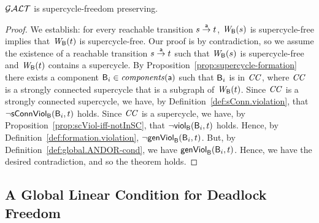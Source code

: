 \begin{theorem} \label{thm:GAO.SC-free-preserving}
$\mathcal{GALT}$ is supercycle-freedom preserving.
\end{theorem}
%
\begin{proof}
We establish:
for every reachable transition $s \stackrel{\mathsf{a}}{\rightarrow} t$,
$\mathit{W}_{\mathsf{B}}({s})$ is supercycle-free implies that $\mathit{W}_{\mathsf{B}}({t})$ is
supercycle-free. Our proof is by contradiction, so we assume the existence of a reachable transition
$s \stackrel{\mathsf{a}}{\rightarrow} t$ such that $\mathit{W}_{\mathsf{B}}({s})$ is supercycle-free and $\mathit{W}_{\mathsf{B}}({t})$ contains a supercycle.
%
By Proposition~\ref{prop:supercycle-formation}
 there exists a component $\mathsf{B}_i \in \mathit{components}(\mathsf{a})$ such that $\mathsf{B}_i$ is in $\mathit{CC}$, where 
$\mathit{CC}$ is a strongly connected supercycle that is a subgraph of $\mathit{W}_{\mathsf{B}}({t})$.
%
Since $\mathit{CC}$ is a strongly connected supercycle, we have,
 by Definition~\ref{def:sConn.violation}, that $\neg \mathsf{sConnViol}_{\mathsf{B}}(\mathsf{B}_i,t)$ holds.
%
Since $\mathit{CC}$ is a supercycle, we have, by Proposition~\ref{prop:scViol-iff-notInSC}, 
that $\neg \mathsf{viol}_{\mathsf{B}}(\mathsf{B}_i,t)$ holds. %
%
Hence, by Definition~\ref{def:formation.violation}, $\neg \mathsf{genViol}_{\mathsf{B}}(\mathsf{B}_i,t)$.
But, by Definition~\ref{def:global.ANDOR-cond}, we have $\mathsf{genViol}_{\mathsf{B}}(\mathsf{B}_i,t)$.
Hence, we have the desired contradiction, and so the theorem holds.
\end{proof}









   \subsection{A Global Linear Condition for Deadlock Freedom}
   \label{s:globCondition}
   \label{s:global.Linear}
   

